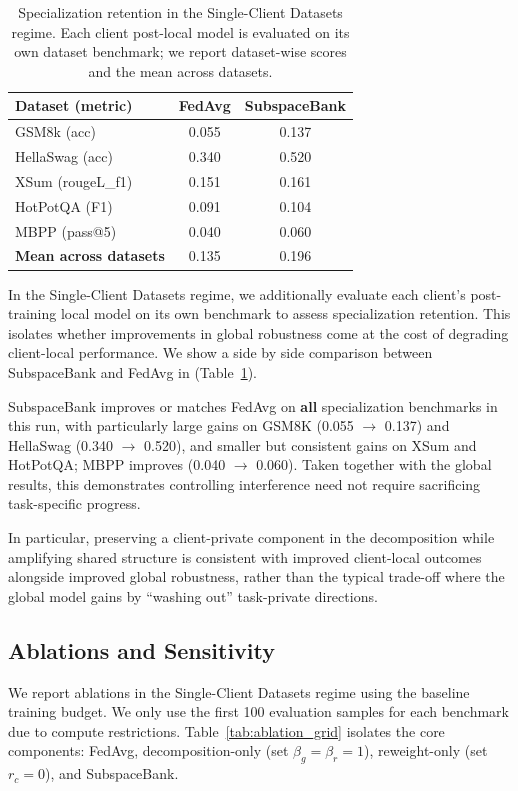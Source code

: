 \documentclass{article}
\theoremstyle{plain}
\theoremstyle{definition}
\theoremstyle{remark}
\begin{document}
\begin{table}[h]
\caption{Specialization retention in the Single-Client Datasets regime. Each client post-local model is evaluated on its own dataset benchmark; we report dataset-wise scores and the mean across datasets.}
  \label{tab:spec_shell}
  \centering
  \begin{small}
  \begin{tabular}{lcc}
    \toprule
    \textbf{Dataset (metric)} & \textbf{FedAvg} & \textbf{SubspaceBank} \\
    \midrule
    GSM8k (acc)          & 0.055 & 0.137 \\
    HellaSwag (acc)      & 0.340 & 0.520 \\
    XSum (rougeL\_f1)     & 0.151 & 0.161 \\
    HotPotQA (F1)        & 0.091 & 0.104 \\
    MBPP (pass@5)        & 0.040 & 0.060 \\
    \midrule
    \textbf{Mean across datasets} & 0.135 & 0.196 \\
    \bottomrule
  \end{tabular}
  \end{small}
\end{table}

In the Single-Client Datasets regime, we additionally evaluate each client’s post-training local model on its own benchmark to assess specialization retention. This isolates whether improvements in global robustness come at the cost of degrading client-local performance. We show a side by side comparison between SubspaceBank and FedAvg in (Table~\ref{tab:spec_shell}).

SubspaceBank improves or matches FedAvg on \textbf{all} specialization benchmarks in this run, with particularly large gains on GSM8K (0.055 $\rightarrow$ 0.137) and HellaSwag (0.340 $\rightarrow$ 0.520), and smaller but consistent gains on XSum and HotPotQA; MBPP improves (0.040 $\rightarrow$ 0.060). Taken together with the global results, this demonstrates controlling interference need not require sacrificing task-specific progress.

In particular, preserving a client-private component in the decomposition while amplifying shared structure is consistent with improved client-local outcomes alongside improved global robustness, rather than the typical trade-off where the global model gains by ``washing out'' task-private directions.


\subsection{Ablations and Sensitivity}
\label{sec:exp-ablations}
We report ablations in the Single-Client Datasets regime using the baseline training budget. We only use the first 100 evaluation samples for each benchmark due to compute restrictions. Table~\ref{tab:ablation_grid} isolates the core components: FedAvg, decomposition-only (set $\beta_g=\beta_r=1$), reweight-only (set $r_c=0$), and SubspaceBank.
\end{document}
